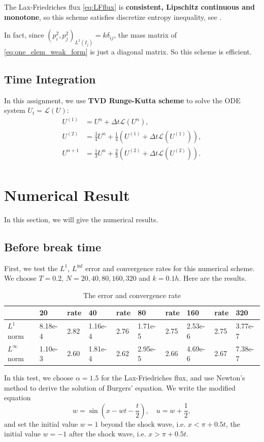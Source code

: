 \documentclass[a4paper]{article}
\begin{document}
The Lax-Friedriches flux \eqref{eq:LFflux} is \textbf{consistent, Lipschitz 
continuous and monotone}, so this scheme satisfies discretize entropy inequality, 
see \cite{2}.

In fact, since $(p_{i}^{2},p_{j}^{2})_{L^{2}(I_j)}=k\delta_{ij}$, the mass matrix of 
\eqref{eq:one_elem_weak_form} is just a diagonal matrix. 
So this scheme is efficient.
\subsection{Time Integration}
In this assignment, we use \textbf{TVD Runge-Kutta scheme} to solve 
the ODE system $U_{t}=\mathcal{L}(U)$:
\begin{equation}
    \label{eq:TVD-RK}
    \begin{aligned}
    U^{(1)}&=U^{n}+\Delta t\mathcal{L}(U^{n}),\\
    U^{(2)}&=\frac{3}{4}U^{n}+\frac{1}{4}(U^{(1)}+\Delta t\mathcal{L}(U^{(1)})),\\
    U^{n+1}&=\frac{1}{3}U^{n}+\frac{2}{3}(U^{(2)}+\Delta t\mathcal{L}(U^{(2)})).\\
    \end{aligned}
\end{equation}
\section{Numerical Result}
In this section, we will give the numerical results.
\subsection{Before break time}
First, we test the $L^{1}$, $L^{\inf}$ error and convergence rates for this numerical scheme. 
We choose $T=0.2$, $N=20,40,80,160,320$ and $k=0.1h$. Here are the results.
\begin{table}[H]
    \begin{tabular}{llllllllll}
        \hline
                          & 20      & rate & 40      & rate & 80      & rate & 160     & rate & 320     \\ \hline
        $L^{1}$ norm      & 8.18e-4 & 2.82 & 1.16e-4 & 2.76 & 1.71e-5 & 2.75 & 2.53e-6 & 2.75 & 3.77e-7 \\
        $L^{\infty}$ norm & 1.10e-3 & 2.60 & 1.81e-4 & 2.62 & 2.95e-5 & 2.66 & 4.69e-6 & 2.67 & 7.38e-7 \\ \hline
    \end{tabular}   
    \caption{The error and convergence rate} 
\end{table} 
In this test, we choose $\alpha=1.5$ for the Lax-Friedriches flux, and use 
Newton's method to derive the solution of Burgers' equation. We write the 
modified equation 
\begin{displaymath}
    w=\sin(x-wt-\frac{t}{2}),\quad u=w+\frac{1}{2},
\end{displaymath}
and set the initial value $w=1$ beyond the shock wave, i.e. $x<\pi+0.5t$, the initial value 
$w=-1$ after the shock wave, i.e. $x>\pi+0.5t$.
\end{document}
